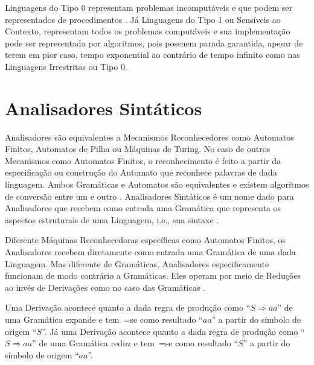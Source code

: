 {    Linguagens do Tipo 0 representam problemas incomputáveis e
    que podem ser representados de procedimentos \cite{sipserBook}.
    Já Linguagens do Tipo 1 ou
    Sensíveis ao Contexto,
    representam todos os problemas computáveis e
    sua implementação pode ser representada por algoritmos,
    pois possuem parada garantida,
    apesar de terem em pior caso,
    tempo exponential ao contrário de tempo infinito como nas Linguagens Irrestritas ou
    Tipo 0.


\section{Analisadores Sintáticos}
\label{analisadoresSintaticos}

    Analisadores são equivalentes a Mecanismos Reconhecedores como Automatos Finitos,
    Automatos de Pilha ou
    Máquinas de Turing.
    No caso de outros Mecanismos como Automatos Finitos,
    o reconhecimento é feito a partir da especificação ou
    construção do Automato que reconhece palavras de dada linguagem.
    Ambos Gramáticas e
    Automatos são equivalentes e
    existem algoritmos de conversão entre um e
    outro \cite{hopcroftBook}.
    Analisadores Sintáticos é um nome dado para Analisadores que recebem como entrada uma Gramática que representa os aspectos estruturais de uma Linguagem,
    i.e.,
    sua sintaxe \cite{ahoCompilerDragonBook}.

    Diferente Máquinas Reconhecedoras específicas como Automatos Finitos,
    os Analisadores recebem diretamente como entrada uma Gramática de uma dada Linguagem.
    Mas diferente de Gramáticas,
    Analisadores especificamente funcionam de modo contrário a Gramáticas.
    Eles operam por meio de Reduções ao invés de Derivações como no caso das Gramáticas \cite{sipserBook}.

    Uma Derivação acontece quanto a dada regra de produção como ``$S \Rightarrow a a $'' de uma Gramática expande e
    tem~=se como resultado ``$a a$'' a partir do símbolo de origem ``$S$''.
    Já uma Derivação acontece quanto a dada regra de produção como ``$S \Rightarrow a a $'' de uma Gramática reduz e
    tem~=se como resultado ``$S$'' a partir do símbolo de origem ``$a a$''.

}
